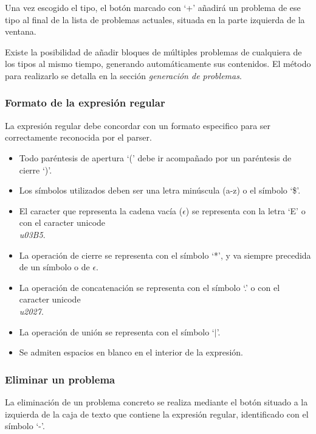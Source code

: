 Una vez escogido el tipo, el botón marcado con `+' añadirá un problema de ese tipo al final de la lista de problemas actuales, situada en la parte izquierda de la ventana.


Existe la posibilidad de añadir bloques de múltiples problemas de cualquiera de los tipos al mismo tiempo, generando automáticamente sus contenidos.
El método para realizarlo se detalla en la sección \emph{generación de problemas}.

\subsubsection{Formato de la expresión regular}
La expresión regular debe concordar con un formato especifico para ser correctamente reconocida por el parser.
\begin{itemize}
	\item Todo paréntesis de apertura `(' debe ir acompañado por un paréntesis de cierre `)'.
	\item Los símbolos utilizados deben ser una letra minúscula (a-z) o el símbolo `\$'.
	\item El caracter que representa la cadena vacía ($ \epsilon $) se representa con la letra `E' o con el caracter unicode \emph{\\u03B5}.
	\item La operación de cierre se representa con el símbolo `*', y va siempre precedida de un símbolo o de $ \epsilon $.
	\item La operación de concatenación se representa con el símbolo `.' o con el caracter unicode \emph{\\u2027}.
	\item La operación de unión se representa con el símbolo `$ | $'.
	\item Se admiten espacios en blanco en el interior de la expresión.
\end{itemize}

\subsubsection{Eliminar un problema}
La eliminación de un problema concreto se realiza mediante el botón situado a la izquierda de la caja de texto que contiene la expresión regular, identificado con el símbolo `-'.



